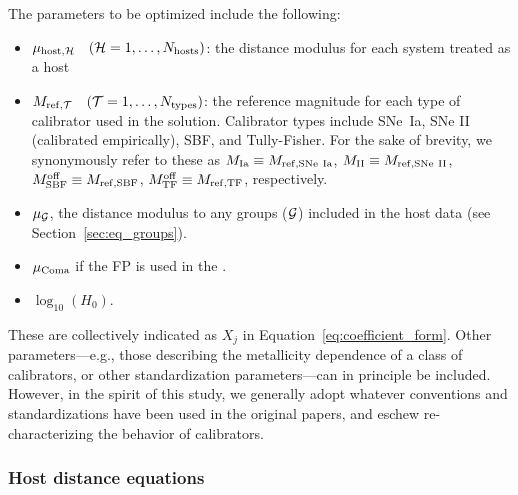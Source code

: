 The parameters to be optimized include the following:

\begin{itemize}
   \item $ \mu_{\rm host, \ihost}  \quad (\ihost = 1, \dots, N_{\rm hosts}) $: the distance modulus for each system treated as a host
   \item $ M_{\rm ref, \itype} \quad (\itype = 1, \dots, N_{\rm types}) $: the reference magnitude for each type of calibrator used in the solution.  
   Calibrator types include SNe~Ia, SNe II (calibrated empirically), 
   SBF, and Tully-Fisher. For the sake of brevity, we synonymously refer to these as $M_{\rm Ia}\equiv M_{\rm ref, SNe~Ia}$, $M_{\rm II}\equiv M_{\rm ref, SNe~II}$, $M^\mathrm{off}_{\rm SBF}\equiv M_{\rm ref, SBF}$,  $M^\mathrm{off}_{\rm TF}\equiv M_{\rm ref, TF}$, respectively. 
   \item $ \mu_{\igroup} $, the distance modulus to any groups ($ \igroup$) included in the host data (see Section~\ref{sec:eq_groups}). 
   \item $ \mu_{\rm Coma} $ if the FP is used in the \DN.
   \item $ \log_{10} (H_0) $.
\end{itemize}

These are collectively indicated as $ X_j $ in Equation~\ref{eq:coefficient_form}. Other parameters---e.g., those describing the metallicity dependence of a class of calibrators, or other standardization parameters---can in principle be included.  However, in the spirit of this study, we generally adopt whatever conventions and standardizations have been used in the original papers, and eschew re-characterizing the behavior of calibrators.

\subsubsection {Host distance equations}
\label{sec:eq_host}

